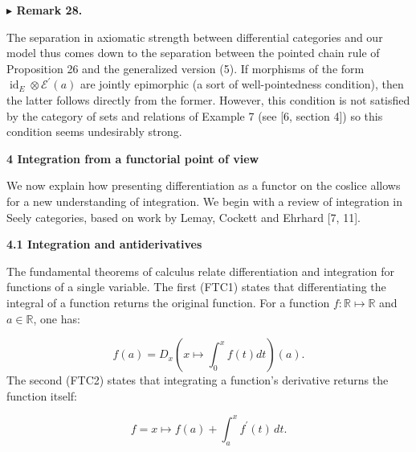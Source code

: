 \par\medskip\noindent\textbf{$\blacktriangleright$ Remark 28.}\par
 
 
The separation in axiomatic strength between differential categories and our model thus comes down to the separation between the pointed chain rule of Proposition 26 and the generalized version (5). If morphisms of the form $\operatorname{id}_{E}\otimes\mathcal{E}^{\prime}(a)$ are jointly epimorphic (a sort of well-pointedness condition), then the latter follows directly from the former. However, this condition is not satisfied by the category of sets and relations of Example 7 (see [6, section 4]) so this condition seems undesirably strong.\par
 
 
 
 


 
\par\medskip\noindent\textbf{4 Integration from a functorial point of view}\par
 
 
We now explain how presenting differentiation as a functor on the coslice allows for a new understanding of integration. We begin with a review of integration in Seely categories, based on work by Lemay, Cockett and Ehrhard [7, 11].\par
 
 
 
\par\medskip\noindent\textbf{4.1 Integration and antiderivatives}\par
 
 
The fundamental theorems of calculus relate differentiation and integration for functions of a single variable. The first (FTC1) states that differentiating the integral of a function returns the original function. For a function $f:\mathbb{R}\mapsto\mathbb{R}$ and $a\in\mathbb{R}$, one has:\par
    \[f(a)=D_{x}\left(x\mapsto\int_{0}^{x}f(t)dt\right)(a).\]    
The second (FTC2) states that integrating a function’s derivative returns the function itself:\par
    \[f=x\mapsto f(a)+\int_{a}^{x}f^{\prime}(t)\,dt.\]    
 
